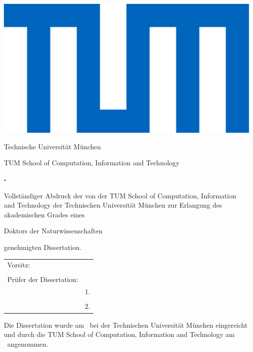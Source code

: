 \thispagestyle{empty}
\hfill
\includegraphics[height=0.1\textwidth]{assets/logo_tum.pdf}
\vspace*{0.5cm}

\begin{center}
	{\Large Technische Universit\"at M\"unchen}
\end{center}
\vspace*{0.5cm}

\begin{center}
	{\Large TUM School of Computation, Information and Technology}
\end{center}
\vspace*{0.5cm}


\begin{center}
	{
		\LARGE\textbf{\getTitle - }\par
		\vspace{0.3cm}
		\large \textbf{\getSubTitle}\par
	}
\end{center}
\vspace*{0.5cm}

\begin{center}
	{\Large \textbf{\getAuthor}}
\end{center}
\vspace*{1.0cm}

\vfill
{\setlength{\parindent}{0cm} Vollst\"andiger Abdruck der von der TUM School of Computation, Information and Technology der Technischen Universit\"at M\"unchen zur Erlangung des akademischen Grades eines}
\begin{center}
	{Doktors der Naturwissenschaften}
\end{center}
{genehmigten Dissertation.}
\vspace*{1cm}
\begin{table}[h]
	\centering
	\begin{tabular}{ll}
		{Vorsitz:}  & {\;\;\; \getChairman} \\
		& \\
		{Pr\"ufer der Dissertation:} & \\
		& {1. \getSupervisor} \\
		& \\	
		& {2. \getExaminer} \\
	\end{tabular}
\end{table}
\vspace*{1cm}

{\setlength{\parindent}{0cm} Die Dissertation wurde am \getSubmissionDate\ bei
	der Technischen Universit\"at M\"unchen eingereicht und durch die
	TUM School of Computation, Information and Technology
	am \getAcceptanceDate\ angenommen.}

\pagestyle{empty}